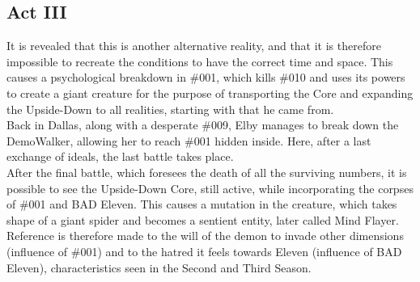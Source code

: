 \subsection{Act III}
It is revealed that this is another alternative reality, and that it is therefore impossible to recreate the conditions to have the correct time and space. This causes a psychological breakdown in \#001, which kills \#010 and uses its powers to create a giant creature for the purpose of transporting the Core and expanding the Upside-Down to all realities, starting with that he came from.\\
Back in Dallas, along with a desperate \#009, Elby manages to break down the DemoWalker, allowing her to reach \#001 hidden inside. Here, after
a last exchange of ideals, the last battle takes place.\\
After the final battle, which foresees the death of all the surviving numbers, it is possible to see the Upside-Down Core, still active, while incorporating
the corpses of \#001 and BAD Eleven. This causes a mutation in the creature, which takes shape of a giant spider and becomes a sentient entity, later called Mind Flayer. Reference is therefore made to the will of the demon to invade other dimensions (influence of \#001) and to the hatred it feels towards Eleven (influence of BAD Eleven), characteristics seen in the Second and Third Season.
